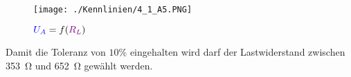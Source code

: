 \documentclass[a4paper,titlepage,parskip]{scrreprt}
\newcommand{\spannung}[1]{\textcolor{blue}{#1}}
\newcommand{\widerstand}[1]{\textcolor{violet}{#1}}
\begin{document}
        	\begin{figure}[!htbp]
            \begin{center}
                \texttt{[image: ./Kennlinien/4\_1\_A5.PNG]}
                
                \caption{$\spannung{U_A} = f(\widerstand{R_L})$}
                
                \label{fig:4_1_A3}
            \end{center}
        \end{figure}
        
        Damit die Toleranz von $10\%$ eingehalten wird darf der Lastwiderstand zwischen \SI{353}{\ohm} und \SI{652}{\ohm} gewählt werden.
        
        
        

    \listoftables
    \listoffigures
\end{document}
